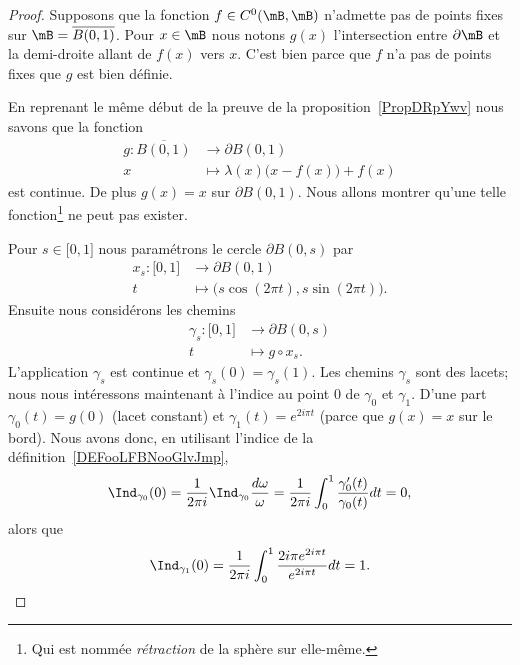 \begin{proof}
	Supposons que la fonction \( f\in C^0(\mB,\mB)\) n'admette pas de points fixes sur \( \mB=\overline{ B(0,1) }\). Pour \( x\in \mB\) nous notons \( g(x)\) l'intersection entre \( \partial \mB\) et la demi-droite allant de \( f(x)\) vers \( x\). C'est bien parce que \( f\) n'a pas de points fixes que \( g\) est bien définie.

	En reprenant le même début de la preuve de la proposition~\ref{PropDRpYwv} nous savons que la fonction
	\begin{equation}
		\begin{aligned}
			g\colon \overline{ B(0,1) } & \to \partial B(0,1)                       \\
			x                           & \mapsto \lambda(x)\big( x-f(x) \big)+f(x)
		\end{aligned}
	\end{equation}
	est continue. De plus \( g(x)=x\) sur \( \partial B(0,1)\). Nous allons montrer qu'une telle fonction\footnote{Qui est nommée \emph{rétraction} de la sphère sur elle-même.} ne peut pas exister.

	Pour \( s\in\mathopen[ 0 , 1 \mathclose]\) nous paramétrons le cercle \( \partial B(0,s)\) par
	\begin{equation}
		\begin{aligned}
			x_s\colon \mathopen[ 0 , 1 \mathclose] & \to \partial B(0,1)                              \\
			t                                      & \mapsto \big( s\cos(2\pi t),s\sin(2\pi t) \big).
		\end{aligned}
	\end{equation}
	Ensuite nous considérons les chemins
	\begin{equation}
		\begin{aligned}
			\gamma_s\colon \mathopen[ 0 , 1 \mathclose] & \to \partial B(0,s) \\
			t                                           & \mapsto g\circ x_s.
		\end{aligned}
	\end{equation}
	L'application \( \gamma_s\) est continue et \( \gamma_s(0)=\gamma_s(1)\). Les chemins \( \gamma_s\) sont des lacets; nous nous intéressons maintenant à l'indice au point \( 0\) de \( \gamma_0\) et \( \gamma_1\). D'une part \( \gamma_0(t)=g(0)\) (lacet constant) et \( \gamma_1(t)= e^{2i\pi t}\) (parce que \( g(x)=x\) sur le bord). Nous avons donc, en utilisant l'indice de la définition~\ref{DEFooLFBNooGlvJmp},
	\begin{equation}
		\Ind_{\gamma_0}(0)=\frac{1}{ 2\pi i }\Ind_{\gamma_0}\frac{ d\omega }{ \omega }=\frac{1}{ 2\pi i }\int_0^1\frac{ \gamma_0'(t) }{ \gamma_0(t) }dt=0,
	\end{equation}
	alors que
	\begin{equation}
		\Ind_{\gamma_1}(0)=\frac{1}{ 2\pi i }\int_0^1\frac{ 2i\pi e^{2i\pi t} }{  e^{2i\pi t} }dt=1.
	\end{equation}


\end{proof}
